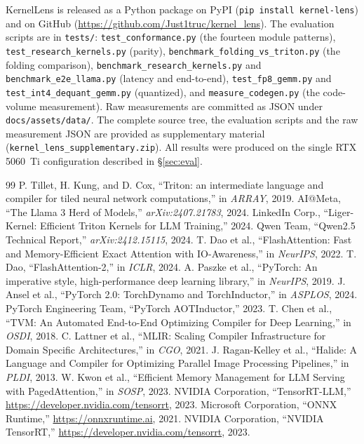 \documentclass[11pt,a4paper]{article}
\begin{document}
KernelLens is released as a Python package on PyPI (\texttt{pip install
kernel-lens}) and on GitHub (\url{https://github.com/Just1truc/kernel_lens}). The
evaluation scripts are in \texttt{tests/}: \texttt{test\_conformance.py} (the
fourteen module patterns), \texttt{test\_research\_kernels.py} (parity),
\texttt{benchmark\_folding\_vs\_triton.py} (the folding comparison),
\texttt{benchmark\_research\_kernels.py} and \texttt{benchmark\_e2e\_llama.py}
(latency and end-to-end), \texttt{test\_fp8\_gemm.py} and
\texttt{test\_int4\_dequant\_gemm.py} (quantized), and
\texttt{measure\_codegen.py} (the code-volume measurement). Raw measurements are
committed as JSON under \texttt{docs/assets/data/}. The complete source tree, the
evaluation scripts and the raw measurement JSON are provided as supplementary
material (\texttt{kernel\_lens\_supplementary.zip}). All results were produced on
the single RTX 5060~Ti configuration described in \S\ref{sec:eval}.

\FloatBarrier
\begin{thebibliography}{99}
 P. Tillet, H. Kung, and D. Cox, ``Triton: an intermediate language and compiler for tiled neural network computations,'' in \textit{ARRAY}, 2019.
 AI@Meta, ``The Llama 3 Herd of Models,'' \textit{arXiv:2407.21783}, 2024.
 LinkedIn Corp., ``Liger-Kernel: Efficient Triton Kernels for LLM Training,'' 2024.
 Qwen Team, ``Qwen2.5 Technical Report,'' \textit{arXiv:2412.15115}, 2024.
 T. Dao et al., ``FlashAttention: Fast and Memory-Efficient Exact Attention with IO-Awareness,'' in \textit{NeurIPS}, 2022.
 T. Dao, ``FlashAttention-2,'' in \textit{ICLR}, 2024.
 A. Paszke et al., ``PyTorch: An imperative style, high-performance deep learning library,'' in \textit{NeurIPS}, 2019.
 J. Ansel et al., ``PyTorch 2.0: TorchDynamo and TorchInductor,'' in \textit{ASPLOS}, 2024.
 PyTorch Engineering Team, ``PyTorch AOTInductor,'' 2023.
 T. Chen et al., ``TVM: An Automated End-to-End Optimizing Compiler for Deep Learning,'' in \textit{OSDI}, 2018.
 C. Lattner et al., ``MLIR: Scaling Compiler Infrastructure for Domain Specific Architectures,'' in \textit{CGO}, 2021.
 J. Ragan-Kelley et al., ``Halide: A Language and Compiler for Optimizing Parallel Image Processing Pipelines,'' in \textit{PLDI}, 2013.
 W. Kwon et al., ``Efficient Memory Management for LLM Serving with PagedAttention,'' in \textit{SOSP}, 2023.
 NVIDIA Corporation, ``TensorRT-LLM,'' \url{https://developer.nvidia.com/tensorrt}, 2023.
 Microsoft Corporation, ``ONNX Runtime,'' \url{https://onnxruntime.ai}, 2021.
 NVIDIA Corporation, ``NVIDIA TensorRT,'' \url{https://developer.nvidia.com/tensorrt}, 2023.
\end{thebibliography}
\end{document}
